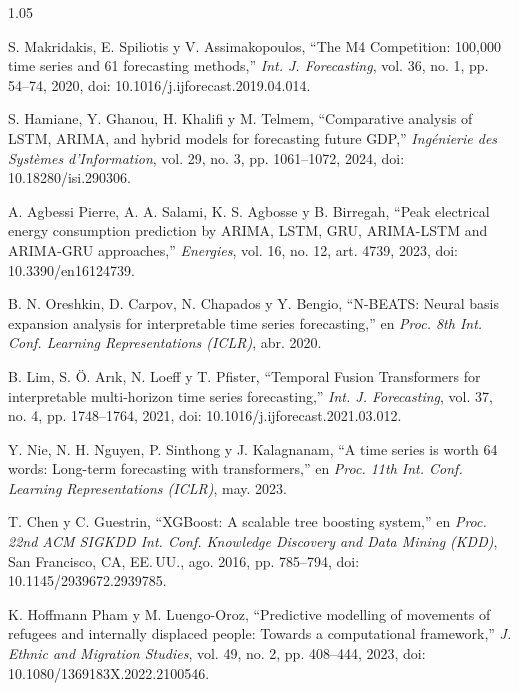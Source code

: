 \documentclass[12pt,letterpaper]{report}
\begin{document}
\begin{spacing}{1.05}
\begin{enumerate}[label={[\arabic*]}, leftmargin=0.9cm, labelsep=0.3cm, itemsep=4pt, parsep=0pt, topsep=0pt]
    \item \label{bib:50} S. Makridakis, E. Spiliotis y V. Assimakopoulos, ``The M4 Competition: 100,000 time series and 61 forecasting methods,'' \textit{Int. J. Forecasting}, vol. 36, no. 1, pp. 54--74, 2020, doi: 10.1016/j.ijforecast.2019.04.014.

    \item \label{bib:51} S. Hamiane, Y. Ghanou, H. Khalifi y M. Telmem, ``Comparative analysis of LSTM, ARIMA, and hybrid models for forecasting future GDP,'' \textit{Ingénierie des Systèmes d'Information}, vol. 29, no. 3, pp. 1061--1072, 2024, doi: 10.18280/isi.290306.

    \item \label{bib:52} A. Agbessi Pierre, A. A. Salami, K. S. Agbosse y B. Birregah, ``Peak electrical energy consumption prediction by ARIMA, LSTM, GRU, ARIMA-LSTM and ARIMA-GRU approaches,'' \textit{Energies}, vol. 16, no. 12, art. 4739, 2023, doi: 10.3390/en16124739.

    \item \label{bib:53} B. N. Oreshkin, D. Carpov, N. Chapados y Y. Bengio, ``N-BEATS: Neural basis expansion analysis for interpretable time series forecasting,'' en \textit{Proc. 8th Int. Conf. Learning Representations (ICLR)}, abr. 2020.

    \item \label{bib:54} B. Lim, S. Ö. Arık, N. Loeff y T. Pfister, ``Temporal Fusion Transformers for interpretable multi-horizon time series forecasting,'' \textit{Int. J. Forecasting}, vol. 37, no. 4, pp. 1748--1764, 2021, doi: 10.1016/j.ijforecast.2021.03.012.

    \item \label{bib:55} Y. Nie, N. H. Nguyen, P. Sinthong y J. Kalagnanam, ``A time series is worth 64 words: Long-term forecasting with transformers,'' en \textit{Proc. 11th Int. Conf. Learning Representations (ICLR)}, may. 2023.

    \item \label{bib:56} T. Chen y C. Guestrin, ``XGBoost: A scalable tree boosting system,'' en \textit{Proc. 22nd ACM SIGKDD Int. Conf. Knowledge Discovery and Data Mining (KDD)}, San Francisco, CA, EE.\,UU., ago. 2016, pp. 785--794, doi: 10.1145/2939672.2939785.

    \item \label{bib:57} K. Hoffmann Pham y M. Luengo-Oroz, ``Predictive modelling of movements of refugees and internally displaced people: Towards a computational framework,'' \textit{J. Ethnic and Migration Studies}, vol. 49, no. 2, pp. 408--444, 2023, doi: 10.1080/1369183X.2022.2100546.


\end{enumerate}
\end{spacing}
\end{document}
